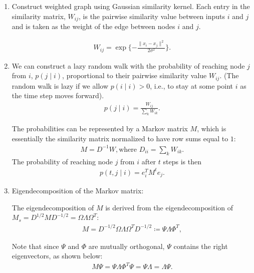 \begin{enumerate}
    \item Construct weighted graph using Gaussian similarity kernel. Each entry in the similarity matrix, $W_{i j}$, is the pairwise similarity value between inputs $i$ and $j$ and is taken as the weight of the edge between nodes $i$ and $j$. 
    
    \begin{align}
        W_{i j } = \exp\{-\frac{\|x_i - x_j\|^2}{2\sigma^2}\}.
    \end{align}
    
    \item We can construct a lazy random walk with the probability of reaching node $j$ from $i$, $p(j \mid i)$, proportional to their pairwise similarity value $W_{i j}$. (The random walk is lazy if we allow $p(i\mid i) > 0$, i.e., to stay at some point $i$ as the time step moves forward). 
    \begin{align}
        p(j\mid i) = \frac{W_{i j}}{\sum_{k} W_{i k}}.
    \end{align}
    
    The probabilities can be represented by a Markov matrix $M$, which is essentially the similarity matrix normalized to have row sums equal to $1$:
     \begin{align}
        M = D^{-1} W, \text{where } D_{i i} =\sum_{k}W_{i k}.
    \end{align}
    The probability of reaching node $j$ from $i$ after $t$ steps is then
    \begin{align}
        p(t,j\mid i) = e_i^T M^t e_j.
    \end{align}

    \item Eigendecomposition of the Markov matrix:
    
    The eigendecomposition of $M$ is derived from the eigendecomposition of $M_s = D^{1/2} M D^{-1/2} = \Omega \Lambda \Omega^T$:
    \begin{align}
        M = D^{-1/2}  \Omega \Lambda \Omega^T D^{-1/2} \coloneqq \Psi \Lambda \Phi^T,
    \end{align}
    
    Note that since $\Psi$ and $\Phi$ are mutually orthogonal, $\Psi$ contains the right eigenvectors, as shown below:
     \begin{align}
        M \Psi =  \Psi \Lambda \Phi^T \Psi = \Psi \Lambda =  \Lambda \Psi.
    \end{align}
    

\end{enumerate}
